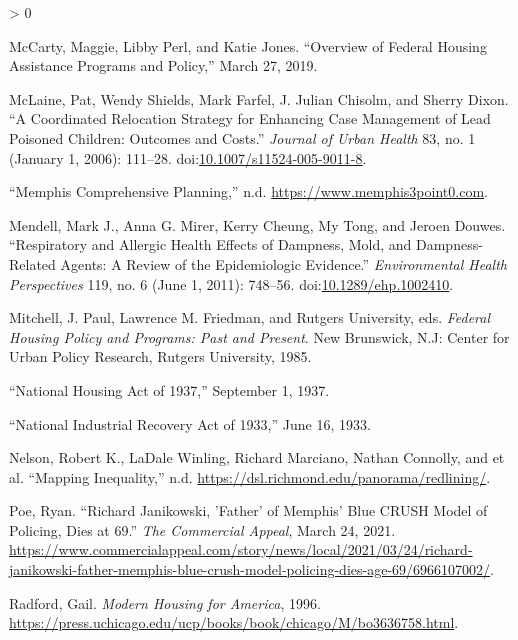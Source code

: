 \documentclass[
  openany]{book}
\newlength{\cslhangindent}
\newenvironment{CSLReferences}[2] %
 {%
  \setlength{\parindent}{0pt}
  \ifodd #1 \everypar{\setlength{\hangindent}{\cslhangindent}}\ignorespaces\fi
  \ifnum #2 > 0
  \setlength{\parskip}{#2\baselineskip}
  \fi
 }%
 {}
\begin{document}
\begin{CSLReferences}{1}{0}
\leavevmode\hypertarget{ref-mccarty2019}{}%
McCarty, Maggie, Libby Perl, and Katie Jones. {``Overview of Federal Housing Assistance Programs and Policy,''} March 27, 2019.

\leavevmode\hypertarget{ref-mclaine2006}{}%
McLaine, Pat, Wendy Shields, Mark Farfel, J. Julian Chisolm, and Sherry Dixon. {``A Coordinated Relocation Strategy for Enhancing Case Management of Lead Poisoned Children: Outcomes and Costs.''} \emph{Journal of Urban Health} 83, no. 1 (January 1, 2006): 111--28. doi:\href{https://doi.org/10.1007/s11524-005-9011-8}{10.1007/s11524-005-9011-8}.

\leavevmode\hypertarget{ref-memphis30}{}%
{``Memphis Comprehensive Planning,''} n.d. \url{https://www.memphis3point0.com}.

\leavevmode\hypertarget{ref-mendell2011}{}%
Mendell, Mark J., Anna G. Mirer, Kerry Cheung, My Tong, and Jeroen Douwes. {``Respiratory and Allergic Health Effects of Dampness, Mold, and Dampness-Related Agents: A Review of the Epidemiologic Evidence.''} \emph{Environmental Health Perspectives} 119, no. 6 (June 1, 2011): 748--56. doi:\href{https://doi.org/10.1289/ehp.1002410}{10.1289/ehp.1002410}.

\leavevmode\hypertarget{ref-federal1985}{}%
Mitchell, J. Paul, Lawrence M. Friedman, and Rutgers University, eds. \emph{Federal Housing Policy and Programs: Past and Present}. New Brunswick, N.J: Center for Urban Policy Research, Rutgers University, 1985.

\leavevmode\hypertarget{ref-national1937}{}%
{``National Housing Act of 1937,''} September 1, 1937.

\leavevmode\hypertarget{ref-national1933}{}%
{``National Industrial Recovery Act of 1933,''} June 16, 1933.

\leavevmode\hypertarget{ref-nelson}{}%
Nelson, Robert K., LaDale Winling, Richard Marciano, Nathan Connolly, and et al. {``Mapping Inequality,''} n.d. \url{https://dsl.richmond.edu/panorama/redlining/}.

\leavevmode\hypertarget{ref-poe2021}{}%
Poe, Ryan. {``Richard Janikowski, 'Father' of Memphis' Blue CRUSH Model of Policing, Dies at 69.''} \emph{The Commercial Appeal}, March 24, 2021. \url{https://www.commercialappeal.com/story/news/local/2021/03/24/richard-janikowski-father-memphis-blue-crush-model-policing-dies-age-69/6966107002/}.

\leavevmode\hypertarget{ref-radford1996}{}%
Radford, Gail. \emph{Modern Housing for America}, 1996. \url{https://press.uchicago.edu/ucp/books/book/chicago/M/bo3636758.html}.


\end{CSLReferences}
\end{document}
